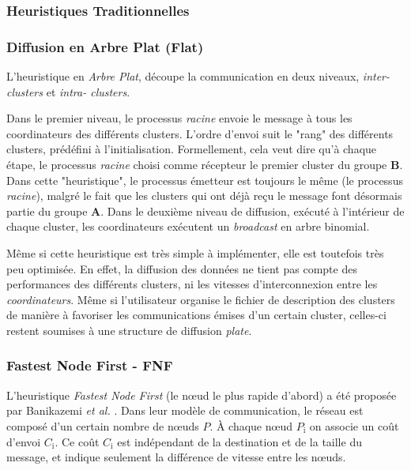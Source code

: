 \subsubsection{Heuristiques Traditionnelles}

\subsubsection*{Diffusion en Arbre Plat (Flat)}

L'heuristique en \emph{Arbre Plat}, découpe la communication en deux niveaux, \emph{inter- clusters}
et \emph{intra- clusters}. 

Dans le premier niveau, le processus \emph{racine} envoie le message
à tous les coordinateurs des différents clusters. L'ordre d'envoi
suit le "rang" des différents clusters, prédéfini à l'initialisation.
Formellement, cela veut dire qu'à chaque étape, le processus \emph{racine}
choisi comme récepteur le premier  cluster du groupe \textbf{B}. Dans
cette "heuristique", le processus émetteur est toujours
le même (le processus \emph{racine}), malgré le fait que les  clusters
qui ont déjà reçu le message font désormais partie du groupe \textbf{A}.
Dans le deuxième niveau de diffusion, exécuté à l'intérieur de chaque
 cluster, les coordinateurs exécutent un \emph{broadcast} en arbre binomial.

Même si cette heuristique est très simple à implémenter, elle est toutefois
très peu optimisée. En effet, la diffusion des données ne tient pas
compte des performances des différents  clusters, ni les vitesses d'interconnexion
entre les \emph{coordinateurs}. Même si l'utilisateur organise le
fichier de description des  clusters de manière à favoriser les communications
émises d'un certain  cluster, celles-ci restent soumises à une structure
de diffusion \emph{plate}. 


\subsubsection*{Fastest Node First - FNF}

L'heuristique \emph{Fastest Node First} (le n{\oe}ud le plus rapide d'abord)
a été proposée par Banikazemi \emph{et al.} \cite{Banikazemi98}.
Dans leur modèle de communication, le réseau est composé d'un certain
nombre de n{\oe}uds \emph{$P$}. À chaque n{\oe}ud \emph{$P_{\textrm{i}}$}
on associe un coût d'envoi \emph{$C_{\textrm{i}}$}. Ce coût \emph{$C_{\textrm{i}}$}
est indépendant de la destination et de la taille du message, et indique
seulement la différence de vitesse entre les n{\oe}uds.

